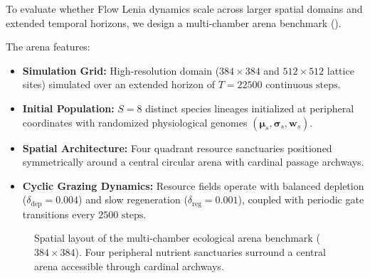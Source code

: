 To evaluate whether Flow Lenia dynamics scale across larger spatial domains and extended temporal horizons, we design a multi-chamber arena benchmark ().

The arena features:
\begin{itemize}
    \item \textbf{Simulation Grid:} High-resolution domain ($384 \times 384$ and $512 \times 512$ lattice sites) simulated over an extended horizon of $T = 22500\text{ continuous steps}$.
    \item \textbf{Initial Population:} $S = 8$ distinct species lineages initialized at peripheral coordinates with randomized physiological genomes $(\boldsymbol{\mu}_s, \boldsymbol{\sigma}_s, \mathbf{w}_s)$.
    \item \textbf{Spatial Architecture:} Four quadrant resource sanctuaries positioned symmetrically around a central circular arena with cardinal passage archways.
    \item \textbf{Cyclic Grazing Dynamics:} Resource fields operate with balanced depletion ($\delta_{\text{dep}} = 0.004$) and slow regeneration ($\delta_{\text{reg}} = 0.001$), coupled with periodic gate transitions every $2500\text{ steps}$.
\end{itemize}

\begin{figure}[htbp]
\centering
{}
\caption{Spatial layout of the multi-chamber ecological arena benchmark ($384 \times 384$). Four peripheral nutrient sanctuaries surround a central arena accessible through cardinal archways.}
\label{fig:diagram_colosseum_arena}
\end{figure}

